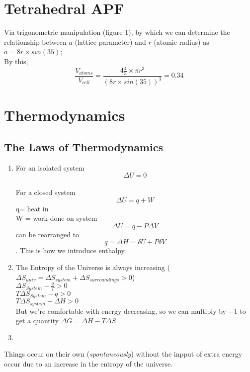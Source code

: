 \documentclass[10pt, twocolumn]{report}
\begin{document}
  \chapter{Tetrahedral APF}
  Via trigonometric manipulation (figure 1), by which we can determine the relationship between $a$ (lattice parameter) and $r$ (atomic radius) as $a = 8 r \times sin(35)$; \\ By this, $$\frac{V_{atoms}}{V_{cell}} = \frac{4 \frac {4}{3} \times \pi r^3}{(8r \times sin (35))^3} = 0.34$$

  \chapter{Thermodynamics}

  \section{The Laws of Thermodynamics}
    \begin{enumerate}
        \item For an isolated system $$\Delta U = 0$$\\For a closed system $$\Delta U = q  + W $$ q= heat in\\W = work done on system\\$$\Delta U = q - P\Delta V$$ can be rearranged to $$q = \Delta H = \delta U  + P \delta V$$. This is how we introduce enthalpy.
        \item The Entropy of the Universe is always increasing ($\Delta S_{univ}= \Delta S_{system} + \Delta S_{surroundings} > 0$)\\$\Delta S_{System} - \frac{q}{T} > 0$\\$T\Delta S_{System} - q > 0$ \\ $T\Delta S_{system}- \Delta H > 0$ \\ But we're comfortable with energy decreasing, so we can multiply by $-1$ to get a quantity $\Delta G = \Delta H - T\Delta S$
        \item
    \end{enumerate}
    Things occur on their own (\textit{spontaneously}) without the inpput of extra energy occur due to an increase in the entropy of the universe.
\end{document}
